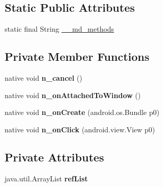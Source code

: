 \subsection*{Static Public Attributes}
\begin{DoxyCompactItemize}
\item 
static final String \hyperlink{classmd5b60ffeb829f638581ab2bb9b1a7f4f3f_1_1ActionSheetRenderer_aba5845659bc7d9990f99b9029736fd0b}{\+\_\+\+\_\+md\+\_\+methods}
\end{DoxyCompactItemize}
\subsection*{Private Member Functions}
\begin{DoxyCompactItemize}
\item 
\mbox{\label{classmd5b60ffeb829f638581ab2bb9b1a7f4f3f_1_1ActionSheetRenderer_ac90962e4fb27e583722acfcfedf93773}} 
native void {\bfseries n\+\_\+cancel} ()
\item 
\mbox{\label{classmd5b60ffeb829f638581ab2bb9b1a7f4f3f_1_1ActionSheetRenderer_a534117b5eec6c3d13772de9722034487}} 
native void {\bfseries n\+\_\+on\+Attached\+To\+Window} ()
\item 
\mbox{\label{classmd5b60ffeb829f638581ab2bb9b1a7f4f3f_1_1ActionSheetRenderer_a35d5cd85a9614eb016e5c4c4db53d36d}} 
native void {\bfseries n\+\_\+on\+Create} (android.\+os.\+Bundle p0)
\item 
\mbox{\label{classmd5b60ffeb829f638581ab2bb9b1a7f4f3f_1_1ActionSheetRenderer_ac3856bef0046ab9e177ae6c8297e493c}} 
native void {\bfseries n\+\_\+on\+Click} (android.\+view.\+View p0)
\end{DoxyCompactItemize}
\subsection*{Private Attributes}
\begin{DoxyCompactItemize}
\item 
\mbox{\label{classmd5b60ffeb829f638581ab2bb9b1a7f4f3f_1_1ActionSheetRenderer_a78f781206c2fbe428d26569e6da13553}} 
java.\+util.\+Array\+List {\bfseries ref\+List}
\end{DoxyCompactItemize}


